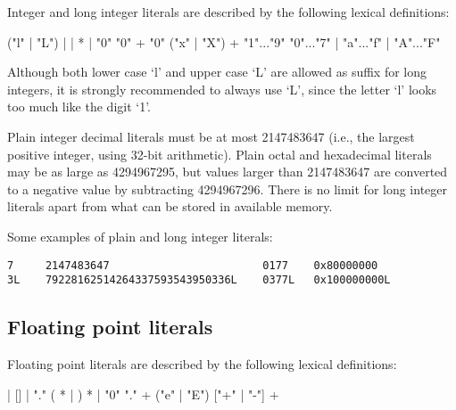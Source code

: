 Integer and long integer literals are described by the following
lexical definitions:

\begin{productionlist}
             { ("l" | "L")}
             { |  | }
             { * | "0"}
             {"0" +}
             {"0" ("x" | "X") +}
             {"1"..."9"}
             {"0"..."7"}
             { | "a"..."f" | "A"..."F"}
\end{productionlist}

Although both lower case `l' and upper case `L' are allowed as suffix
for long integers, it is strongly recommended to always use `L', since
the letter `l' looks too much like the digit `1'.

Plain integer decimal literals must be at most 2147483647 (i.e., the
largest positive integer, using 32-bit arithmetic).  Plain octal and
hexadecimal literals may be as large as 4294967295, but values larger
than 2147483647 are converted to a negative value by subtracting
4294967296.  There is no limit for long integer literals apart from
what can be stored in available memory.

Some examples of plain and long integer literals:

\begin{verbatim}
7     2147483647                        0177    0x80000000
3L    79228162514264337593543950336L    0377L   0x100000000L
\end{verbatim}


\subsection{Floating point literals\label{floating}}

Floating point literals are described by the following lexical
definitions:

\begin{productionlist}
             { | }
             {[]  |  "."}
             {( * | )
              }
             { * | "0"}
             {"." +}
             {("e" | "E") ["+" | "-"] +}
\end{productionlist}

